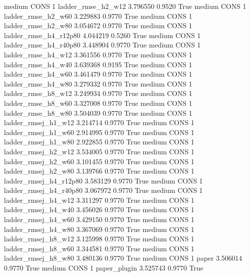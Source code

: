     medium     CONS                 1     ladder_rmse_h2_w12   3.796550      0.9520    True
    medium     CONS                 1     ladder_rmse_h2_w60   3.229883      0.9770    True
    medium     CONS                 1     ladder_rmse_h2_w80   3.054672      0.9770    True
    medium     CONS                 1  ladder_rmse_h4_r12p80   4.044219      0.5260    True
    medium     CONS                 1  ladder_rmse_h4_r40p80   3.448904      0.9770    True
    medium     CONS                 1     ladder_rmse_h4_w12   3.361556      0.9770    True
    medium     CONS                 1     ladder_rmse_h4_w40   3.639368      0.9195    True
    medium     CONS                 1     ladder_rmse_h4_w60   3.461479      0.9770    True
    medium     CONS                 1     ladder_rmse_h4_w80   3.279332      0.9770    True
    medium     CONS                 1     ladder_rmse_h8_w12   3.249934      0.9770    True
    medium     CONS                 1     ladder_rmse_h8_w60   3.327008      0.9770    True
    medium     CONS                 1     ladder_rmse_h8_w80   3.504039      0.9770    True
    medium     CONS                 1    ladder_rmsej_h1_w12   3.214714      0.9770    True
    medium     CONS                 1    ladder_rmsej_h1_w60   2.914995      0.9770    True
    medium     CONS                 1    ladder_rmsej_h1_w80   2.922855      0.9770    True
    medium     CONS                 1    ladder_rmsej_h2_w12   3.534005      0.9770    True
    medium     CONS                 1    ladder_rmsej_h2_w60   3.101455      0.9770    True
    medium     CONS                 1    ladder_rmsej_h2_w80   3.139766      0.9770    True
    medium     CONS                 1 ladder_rmsej_h4_r12p80   3.583129      0.9770    True
    medium     CONS                 1 ladder_rmsej_h4_r40p80   3.067972      0.9770    True
    medium     CONS                 1    ladder_rmsej_h4_w12   3.311297      0.9770    True
    medium     CONS                 1    ladder_rmsej_h4_w40   3.456026      0.9770    True
    medium     CONS                 1    ladder_rmsej_h4_w60   3.429150      0.9770    True
    medium     CONS                 1    ladder_rmsej_h4_w80   3.367069      0.9770    True
    medium     CONS                 1    ladder_rmsej_h8_w12   3.125998      0.9770    True
    medium     CONS                 1    ladder_rmsej_h8_w60   3.344581      0.9770    True
    medium     CONS                 1    ladder_rmsej_h8_w80   3.480136      0.9770    True
    medium     CONS                 1                  paper   3.506014      0.9770    True
    medium     CONS                 1           paper_plugin   3.525743      0.9770    True

